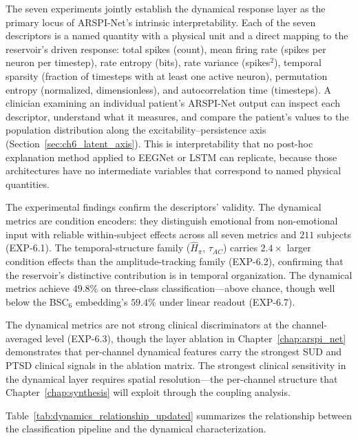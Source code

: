 The seven experiments jointly establish the dynamical response layer as the primary locus of ARSPI-Net's intrinsic interpretability. Each of the seven descriptors is a named quantity with a physical unit and a direct mapping to the reservoir's driven response: total spikes (count), mean firing rate (spikes per neuron per timestep), rate entropy (bits), rate variance (spikes$^2$), temporal sparsity (fraction of timesteps with at least one active neuron), permutation entropy (normalized, dimensionless), and autocorrelation time (timesteps). A clinician examining an individual patient's ARSPI-Net output can inspect each descriptor, understand what it measures, and compare the patient's values to the population distribution along the excitability--persistence axis (Section~\ref{sec:ch6_latent_axis}). This is interpretability that no post-hoc explanation method applied to EEGNet or LSTM can replicate, because those architectures have no intermediate variables that correspond to named physical quantities.

The experimental findings confirm the descriptors' validity. The dynamical metrics are condition encoders: they distinguish emotional from non-emotional input with reliable within-subject effects across all seven metrics and $211$ subjects (EXP-6.1). The temporal-structure family ($\hat{H}_{\pi}$, $\tau_{AC}$) carries $2.4\times$ larger condition effects than the amplitude-tracking family (EXP-6.2), confirming that the reservoir's distinctive contribution is in temporal organization. The dynamical metrics achieve $49.8\%$ on three-class classification---above chance, though well below the BSC$_6$ embedding's $59.4\%$ under linear readout (EXP-6.7).

The dynamical metrics are not strong clinical discriminators at the channel-averaged level (EXP-6.3), though the layer ablation in Chapter~\ref{chap:arspi_net} demonstrates that per-channel dynamical features carry the strongest SUD and PTSD clinical signals in the ablation matrix. The strongest clinical sensitivity in the dynamical layer requires spatial resolution---the per-channel structure that Chapter~\ref{chap:synthesis} will exploit through the coupling analysis.

Table~\ref{tab:dynamics_relationship_updated} summarizes the relationship between the classification pipeline and the dynamical characterization.

